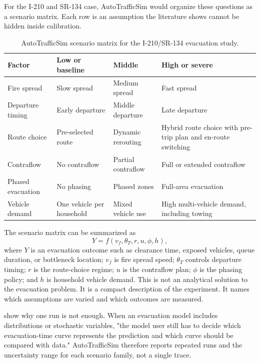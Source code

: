 \begin{bibunit}[plainnat]
For the I-210 and SR-134 case, AutoTrafficSim would organize these
questions as a scenario matrix. Each row is an assumption the literature
shows cannot be hidden inside calibration.

\begin{table}[H]
\centering
\renewcommand{\arraystretch}{1.3}
\caption{AutoTrafficSim scenario matrix for the I-210/SR-134 evacuation study.}
\label{tab:q2_scenario_matrix}
\begin{tabularx}{\textwidth}{>{\raggedright\arraybackslash}p{2.8cm} >{\raggedright\arraybackslash}X >{\raggedright\arraybackslash}X >{\raggedright\arraybackslash}X}
\toprule
\textbf{Factor} & \textbf{Low or baseline} & \textbf{Middle} & \textbf{High or severe} \\
\midrule
Fire spread & Slow spread & Medium spread & Fast spread \\
\midrule
Departure timing & Early departure & Middle departure & Late departure \\
\midrule
Route choice & Pre-selected route & Dynamic rerouting & Hybrid route choice with pre-trip plan and en-route switching \\
\midrule
Contraflow & No contraflow & Partial contraflow & Full or extended contraflow \\
\midrule
Phased evacuation & No phasing & Phased zones & Full-area evacuation \\
\midrule
Vehicle demand & One vehicle per household & Mixed vehicle use & High multi-vehicle demand, including towing \\
\bottomrule
\end{tabularx}
\end{table}

The scenario matrix can be summarized as
\[
  Y = f(v_f,\theta_T,r,u,\phi,h),
\]
where $Y$ is an evacuation outcome such as clearance time, exposed
vehicles, queue duration, or bottleneck location; $v_f$ is fire spread
speed; $\theta_T$ controls departure timing; $r$ is the route-choice
regime; $u$ is the contraflow plan; $\phi$ is the phasing policy; and
$h$ is household vehicle demand. This is not an analytical solution to
the evacuation problem. It is a compact description of the experiment.
It names which assumptions are varied and which outcomes are measured.

\citet{ronchi2014uncertainty} show why one run is not enough. When an
evacuation model includes distributions or stochastic variables, "the
model user still has to decide which evacuation-time curve represents
the prediction and which curve should be compared with data."
AutoTrafficSim therefore reports repeated runs and the uncertainty
range for each scenario family, not a single trace.


\end{bibunit}
